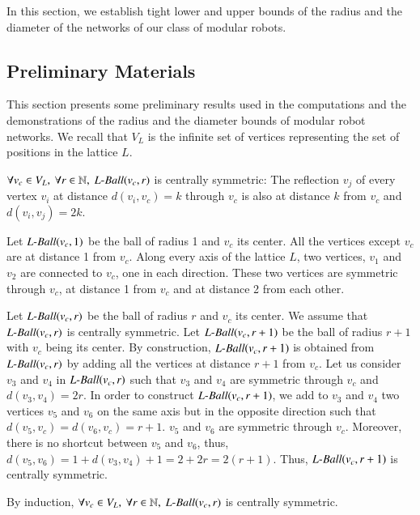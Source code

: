 In this section, we establish tight lower and upper bounds of the radius and the diameter of the networks of our class of modular robots.

\subsection{Preliminary Materials}

This section presents some preliminary results used in the computations and the demonstrations of the radius and the diameter bounds of modular robot networks. We recall that $V_L$ is the infinite set of vertices representing the set of positions in the lattice $L$.

\begin{cor}
	\label{corollary:centrally-symmetric}
	$\forall v_c \in V_L,\ \forall r \in \mathbb{N},\  \LBall{L}(v_c,r)$ is centrally symmetric: The reflection $v_j$ of every vertex $v_i$ at distance $d(v_i,v_c) = k$ through $v_c$ is also at distance $k$ from $v_c$ and $d(v_i,v_j) = 2 k$.
\end{cor}

\begin{pf}	
	Let $\mathop{L{\textnormal{-}Ball}}(v_c,1)$ be the ball of radius 1 and $v_c$ its center. All the vertices except $v_c$ are at distance 1 from $v_c$. Along every axis of the lattice $L$, two vertices, $v_1$ and $v_2$ are connected to $v_c$, one in each direction. These two vertices are symmetric through $v_c$, at distance 1 from $v_c$ and at distance 2 from each other.
	
	Let $\mathop{L{\textnormal{-}Ball}}(v_c,r)$ be the ball of radius $r$ and $v_c$ its center. We assume that $\mathop{L{\textnormal{-}Ball}}(v_c,r)$ is centrally symmetric. Let $\mathop{L{\textnormal{-}Ball}}(v_c,r+1)$ be the ball of radius $r+1$ with $v_c$ being its center. By construction, $\mathop{L{\textnormal{-}Ball}}(v_c,r+1)$ is obtained from $\mathop{L{\textnormal{-}Ball}}(v_c,r)$ by adding all the vertices at distance $r+1$ from $v_c$. Let us consider $v_3$ and $v_4$ in $\mathop{L{\textnormal{-}Ball}}(v_c,r)$ such that $v_3$ and $v_4$ are symmetric through $v_c$ and $d(v_3,v_4) = 2r$. In order to construct $\mathop{L{\textnormal{-}Ball}}(v_c,r+1)$, we add to $v_3$ and $v_4$ two vertices $v_5$ and $v_6$ on the same axis but in the opposite direction such that $d(v_5,v_c) = d(v_6,v_c) = r+1$. $v_5$ and $v_6$ are symmetric through $v_c$. Moreover, there is no shortcut between $v_5$ and $v_6$, thus, $d(v_5,v_6) = 1 + d(v_3,v_4) + 1 = 2 + 2r = 2(r+1)$. Thus, $\mathop{L{\textnormal{-}Ball}}(v_c,r+1)$ is centrally symmetric.
	
	By induction, $\forall v_c \in V_L,\ \forall r \in \mathbb{N},\ \LBall{L}(v_c,r)$ is centrally symmetric.
\end{pf}

